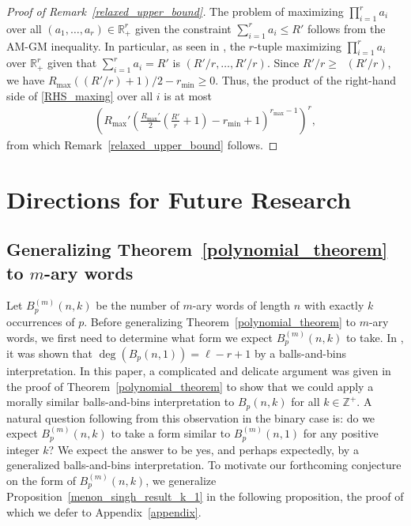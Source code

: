 \documentclass[11pt]{amsart}
\newcommand{\RR}{\mathbb{R}}
\newcommand{\ZZ}{\mathbb{Z}}
\DeclareMathOperator{\oddleq}{\mathcal{O}_{\leq}}
\begin{document}
\begin{proof}[Proof of Remark~\ref{relaxed_upper_bound}]
    The problem of maximizing $\prod_{i=1}^{r}a_i$ over all $(a_1,\dots,a_r)\in\RR^r_{+}$ given the constraint $\sum_{i=1}^{r}a_i\leq R'$ follows from the AM-GM inequality. In particular, as seen in \cite[Lemma 1]{AM_GM_max}, the $r$-tuple maximizing $\prod_{i=1}^{r}a_i$ over $\RR^r_{+}$ given that $\sum_{i=1}^{r}a_i= R'$ is $(R'/r,\dots,R'/r)$. Since $R'/r\geq\oddleq (R'/r)$, we have $R_{\max}((R'/r)+1)/2-r_{\min}\geq0$. Thus, the product of the right-hand side of \eqref{RHS_maxing} over all $i$ is at most
    \begin{align*}
        \left(R_{\max}'\left(\frac{R_{\max}'}{2}\left(\frac{R'}{r}+1\right)-r_{\min}+1\right)^{r_{\max}-1}\right)^r,
    \end{align*}
    from which Remark~\ref{relaxed_upper_bound} follows.
\end{proof}

\section{Directions for Future Research}\label{section_4}

\subsection{Generalizing Theorem~\ref{polynomial_theorem} to $m$-ary words}\label{polynomial_m_ary_section}

Let $B_p^{(m)}(n,k)$ be the number of $m$-ary words of length $n$ with exactly $k$ occurrences of $p$. Before generalizing Theorem~\ref{polynomial_theorem} to $m$-ary words, we first need to determine what form we expect $B_p^{(m)}(n,k)$ to take. In \cite{subseq_freq}, it was shown that $\deg(B_p(n,1))=\ell-r+1$ by a balls-and-bins interpretation. In this paper, a complicated and delicate argument was given in the proof of Theorem~\ref{polynomial_theorem} to show that we could apply a morally similar balls-and-bins interpretation to $B_p(n,k)$ for all $k\in\ZZ^+$. A natural question following from this observation in the binary case is: do we expect $B_p^{(m)}(n,k)$ to take a form similar to $B_p^{(m)}(n,1)$ for any positive integer $k$? We expect the answer to be yes, and perhaps expectedly, by a generalized balls-and-bins interpretation. To motivate our forthcoming conjecture on the form of $B_p^{(m)}(n,k)$, we generalize Proposition~\ref{menon_singh_result_k_1} in the following proposition, the proof of which we defer to Appendix~\ref{appendix}.
\end{document}
